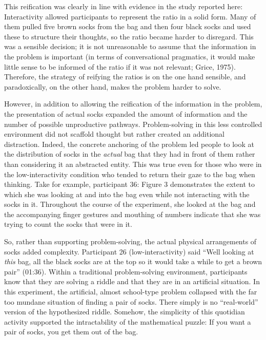 \documentclass[twocolumn, serif, empirical, authordate]{jote-article}
\begin{document}
{{This reification was clearly in line with evidence in the study reported here: Interactivity allowed participants to represent the ratio in a solid form. Many of them pulled five brown socks from the bag and then four black socks and used these to structure their thoughts, so the ratio became harder to disregard. This was a sensible decision; it is not unreasonable to assume that the information in the problem is important (in terms of conversational pragmatics, it would make little sense to be informed of the ratio if it was not relevant; Grice, 1975).
Therefore, the strategy of reifying the ratios is on the one hand sensible, and paradoxically, on the other hand, makes the problem harder to solve.

However, in addition to allowing the reification of the information in the problem, the presentation of actual socks expanded the amount of information and the number of possible unproductive pathways.
Problem-solving in this less controlled environment did not scaffold thought but rather created an additional distraction. Indeed, the concrete anchoring of the problem led people to look at the distribution of socks in the \emph{actual} bag that they had in front of them rather than considering it an abstracted entity. This was true even for those who were in the low-interactivity condition who tended to return their gaze to the bag when thinking. Take for example, participant 36: Figure 3 demonstrates the extent to which she was looking at and into the bag even while not interacting with the socks in it. Throughout the course of the experiment, she looked at the bag and the accompanying finger gestures and mouthing of numbers indicate that she was trying to count the socks that were in it.

So, rather than supporting problem-solving, the actual physical arrangements of socks added complexity. Participant 26 (low-interactivity) said ``Well looking at \emph{this} bag, all the black socks are at the top so it would take a while to get a brown pair'' (01:36). Within a traditional problem-solving environment, participants know that they are solving a riddle and that they are in an artificial situation. In this experiment, the artificial, almost school-type problem collapsed with the far too mundane situation of finding a pair of socks. There simply is no ``real-world'' version of the hypothesized riddle. Somehow, the simplicity of this quotidian activity supported the intractability of the mathematical puzzle: If you want a pair of socks, you get them out of the bag.


}}
\end{document}
